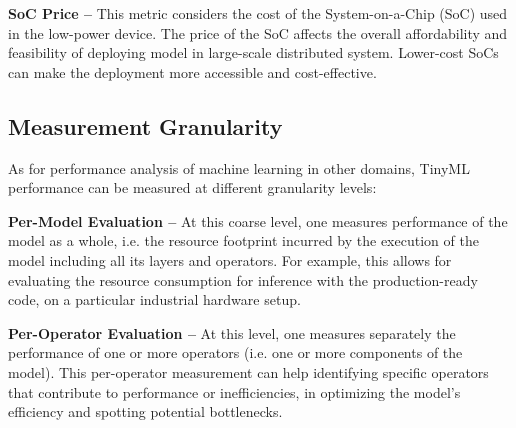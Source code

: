 {\bf SoC Price --} This metric considers the cost of the System-on-a-Chip (SoC) used in the low-power device. The price of the SoC affects the overall affordability and feasibility of deploying model in large-scale distributed system. Lower-cost SoCs can make the deployment more accessible and cost-effective.

\subsection{Measurement Granularity}
As for performance analysis of machine learning in other domains, TinyML performance can be measured at different granularity levels:

{\bf Per-Model Evaluation --}
At this coarse level, one measures performance of the model as a whole, i.e. the resource footprint incurred by the execution of the model including all its layers and operators. For example, this allows for evaluating the resource consumption for inference with the production-ready code, on a particular industrial hardware setup.

{\bf Per-Operator Evaluation --}
At this level, one measures separately the performance of one or more operators (i.e. one or more components of the model). This per-operator measurement can help identifying specific operators that contribute to performance or inefficiencies, in optimizing the model's efficiency and spotting potential bottlenecks.

